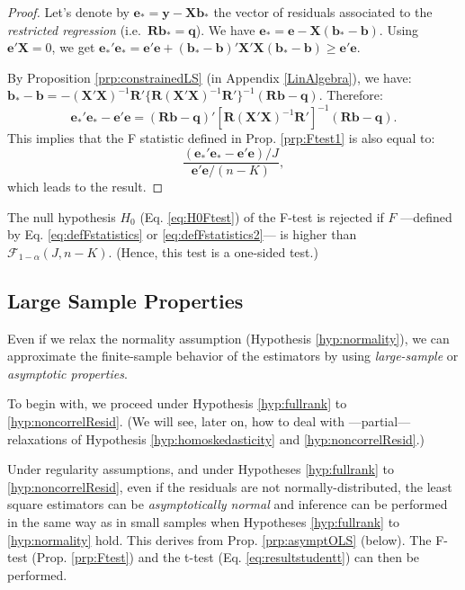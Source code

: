 \documentclass[
  12pt,
]{book}
\theoremstyle{definition}
\theoremstyle{definition}
\theoremstyle{definition}
\theoremstyle{definition}
\theoremstyle{remark}
\begin{document}
\begin{proof}
Let's denote by \(\mathbf{e}_*=\mathbf{y}-\mathbf{X}\mathbf{b}_*\) the vector of residuals associated to the \emph{restricted regression} (i.e.~\(\mathbf{R}\mathbf{b}_*=\mathbf{q}\)).
We have \(\mathbf{e}_*=\mathbf{e} - \mathbf{X}(\mathbf{b}_*-\mathbf{b})\). Using \(\mathbf{e}'\mathbf{X}=0\), we get \(\mathbf{e}_*'\mathbf{e}_*=\mathbf{e}'\mathbf{e} + (\mathbf{b}_*-\mathbf{b})'\mathbf{X}'\mathbf{X}(\mathbf{b}_*-\mathbf{b}) \ge \mathbf{e}'\mathbf{e}\).

By Proposition \ref{prp:constrainedLS} (in Appendix \ref{LinAlgebra}), we have: \(\mathbf{b}_*-\mathbf{b}=-(\mathbf{X}'\mathbf{X})^{-1} \mathbf{R}'\{\mathbf{R}(\mathbf{X}'\mathbf{X})^{-1}\mathbf{R}'\}^{-1}(\mathbf{R}\mathbf{b} - \mathbf{q})\). Therefore:
\[
\mathbf{e}_*'\mathbf{e}_* - \mathbf{e}'\mathbf{e} = (\mathbf{R}\mathbf{b} - \mathbf{q})'[\mathbf{R}(\mathbf{X}'\mathbf{X})^{-1}\mathbf{R}']^{-1}(\mathbf{R}\mathbf{b} - \mathbf{q}).
\]
This implies that the F statistic defined in Prop. \ref{prp:Ftest1} is also equal to:
\[
\frac{(\mathbf{e}_*'\mathbf{e}_* - \mathbf{e}'\mathbf{e})/J}{\mathbf{e}'\mathbf{e}/(n-K)},
\]
which leads to the result.
\end{proof}

The null hypothesis \(H_0\) (Eq. \eqref{eq:H0Ftest}) of the F-test is rejected if \(F\) ---defined by Eq. \eqref{eq:defFstatistics} or \eqref{eq:defFstatistics2}--- is higher than \(\mathcal{F}_{1-\alpha}(J,n-K)\). (Hence, this test is a one-sided test.)

\hypertarget{largeSample}{%
\subsection{Large Sample Properties}\label{largeSample}}

Even if we relax the normality assumption (Hypothesis \ref{hyp:normality}), we can approximate the finite-sample behavior of the estimators by using \emph{large-sample} or \emph{asymptotic properties}.

To begin with, we proceed under Hypothesis \ref{hyp:fullrank} to \ref{hyp:noncorrelResid}. (We will see, later on, how to deal with ---partial--- relaxations of Hypothesis \ref{hyp:homoskedasticity} and \ref{hyp:noncorrelResid}.)

Under regularity assumptions, and under Hypotheses \ref{hyp:fullrank} to \ref{hyp:noncorrelResid}, even if the residuals are not normally-distributed, the least square estimators can be \emph{asymptotically normal} and inference can be performed in the same way as in small samples when Hypotheses \ref{hyp:fullrank} to \ref{hyp:normality} hold. This derives from Prop. \ref{prp:asymptOLS} (below). The F-test (Prop. \ref{prp:Ftest}) and the t-test (Eq. \eqref{eq:resultstudentt}) can then be performed.
\end{document}
